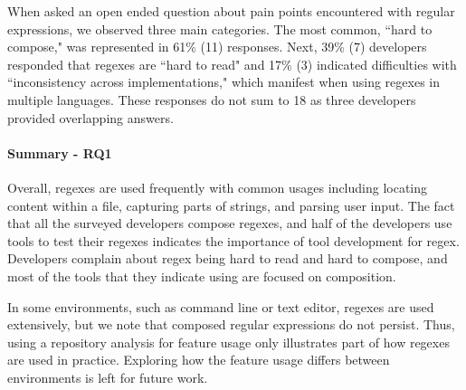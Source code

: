 When asked an open ended question about pain points encountered with regular expressions, we observed three main categories. The most common, ``hard to compose," was represented in 61\% (11) responses. Next, 
 39\% (7) developers responded that regexes are ``hard to read" and 17\% (3) indicated difficulties with ``inconsistency across implementations," which manifest when using regexes in multiple languages. These responses do not sum to 18 as three developers provided overlapping  answers.

\paragraph{Summary - RQ1}

Overall, regexes are used frequently with common usages including locating content within a file, capturing parts of strings, and parsing user input. 
The fact that all the surveyed developers compose regexes, and half of the developers use tools to test their regexes indicates the importance of tool development for regex.  Developers complain about regex being hard to read and hard to compose, and most of the tools that they indicate using are focused on composition. 

In some environments, such as command line or text editor, regexes are used extensively, but we note that composed regular expressions do not persist. Thus, using a repository analysis for feature usage only illustrates part of how regexes are used in practice. Exploring how the feature usage differs between environments is left for future work. 


